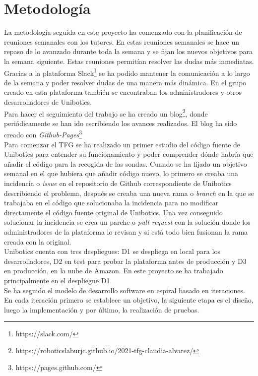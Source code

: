 \section{Metodología}

La metodología seguida en este proyecto ha comenzado con la planificación de reuniones semanales con los tutores. En estas reuniones semanales se hace un repaso de lo avanzado durante toda la semana y se fijan los nuevos objetivos para la semana siguiente. Estas reuniones permitían resolver las dudas más inmediatas. Gracias a la plataforma Slack\footnote{https://slack.com/} se ha podido mantener la comunicación a lo largo de la semana y poder resolver dudas de una manera más dinámica. En el grupo creado en esta plataforma también se encontraban los administradores y otros desarrolladores de Unibotics.\\

Para hacer el seguimiento del trabajo se ha creado un blog\footnote{https://roboticslaburjc.github.io/2021-tfg-claudia-alvarez/}, donde periódicamente se han ido escribiendo los avances realizados. El blog ha sido creado con \textit{Github-Pages}\footnote{https://pages.github.com/}\\

Para comenzar el TFG se ha realizado un primer estudio del código fuente de Unibotics para entender su funcionamiento y poder comprender dónde habría que añadir el código para la recogida de las sondas. Cuando se ha fijado un objetivo semanal en el que hubiera que añadir código nuevo, lo primero se creaba una incidencia o \textit{issue} en el repositorio de Github correspondiente de Unibotics describiendo el problema, después se creaba una nueva rama o \textit{branch} en la que se trabajaba en el código que solucionaba la incidencia para no modificar directamente el código fuente original de Unibotics. Una vez conseguido solucionar la incidencia se crea un parche o \textit{pull request} con la solución donde los administradores de la plataforma lo revisan y si está todo bien fusionan la rama creada con la original.\\

Unibotics cuenta con tres despliegues: D1 se despliega en local para los desarrolladores, D2 en test para probar la plataforma antes de producción y D3 en producción, en la nube de Amazon. En este proyecto se ha trabajado principalmente en el despliegue D1.\\

Se ha seguido el modelo de desarrollo software en espiral basado en iteraciones. En cada iteración primero se establece un objetivo, la siguiente etapa es el diseño, luego la implementación y por último, la realización de pruebas.


